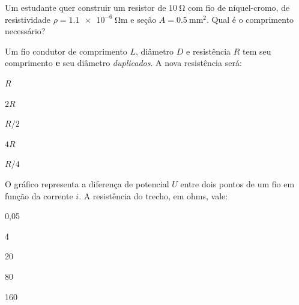 \blocoaplicacao
\begin{questao}[2]{}

Um estudante quer construir um resistor de $\SI{10}{\ohm}$ com fio de
níquel-cromo, de resistividade $\rho = \SI{1.1e-6}{\ohm\meter}$ e seção
$A = \SI{0.5}{\milli\meter\squared}$. Qual é o comprimento necessário?


\end{questao}
\begin{questao}[2]{}

Um fio condutor de comprimento $L$, diâmetro $D$ e resistência $R$ tem seu
comprimento \textbf{e} seu diâmetro \emph{duplicados}. A nova resistência será:
\begin{alternativas}[3]
\item $R$
\item $2R$
\item $R/2$
\item $4R$
\item $R/4$
\end{alternativas}


\end{questao}
\begin{questao}[2]{}

O gráfico representa a diferença de potencial $U$ entre dois pontos de um fio em
função da corrente $i$. A resistência do trecho, em ohms, vale:


\begin{alternativas}[3]
\item 0,05
\item 4
\item 20
\item 80
\item 160
\end{alternativas}


\end{questao}
